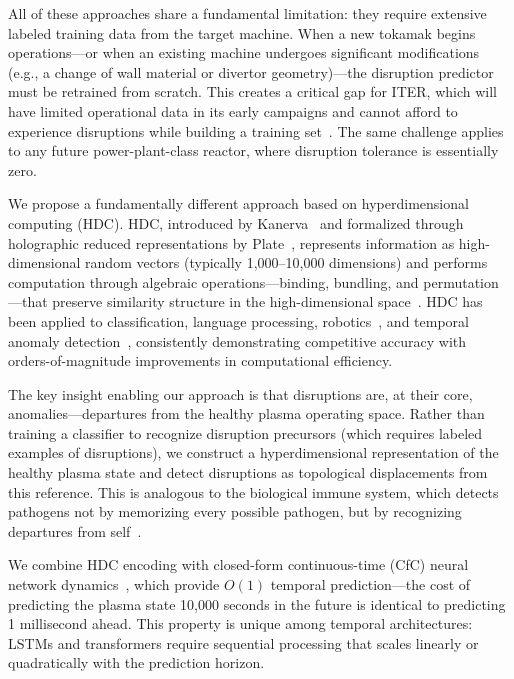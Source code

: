 \documentclass[twocolumn,prl,aps,superscriptaddress,floatfix]{revtex4-2}
\begin{document}
All of these approaches share a fundamental limitation: they require extensive labeled training data from the target machine. When a new tokamak begins operations---or when an existing machine undergoes significant modifications (e.g., a change of wall material or divertor geometry)---the disruption predictor must be retrained from scratch. This creates a critical gap for ITER, which will have limited operational data in its early campaigns and cannot afford to experience disruptions while building a training set~\cite{Strait2019,ITER2018}. The same challenge applies to any future power-plant-class reactor, where disruption tolerance is essentially zero.

We propose a fundamentally different approach based on hyperdimensional computing (HDC). HDC, introduced by Kanerva~\cite{Kanerva2009} and formalized through holographic reduced representations by Plate~\cite{Plate2003}, represents information as high-dimensional random vectors (typically 1,000--10,000 dimensions) and performs computation through algebraic operations---binding, bundling, and permutation---that preserve similarity structure in the high-dimensional space~\cite{Ge2020}. HDC has been applied to classification, language processing, robotics~\cite{Neubert2019}, and temporal anomaly detection~\cite{Thomas2022}, consistently demonstrating competitive accuracy with orders-of-magnitude improvements in computational efficiency.

The key insight enabling our approach is that disruptions are, at their core, anomalies---departures from the healthy plasma operating space. Rather than training a classifier to recognize disruption precursors (which requires labeled examples of disruptions), we construct a hyperdimensional representation of the healthy plasma state and detect disruptions as topological displacements from this reference. This is analogous to the biological immune system, which detects pathogens not by memorizing every possible pathogen, but by recognizing departures from self~\cite{Friston2010}.

We combine HDC encoding with closed-form continuous-time (CfC) neural network dynamics~\cite{Hasani2022}, which provide $O(1)$ temporal prediction---the cost of predicting the plasma state 10,000 seconds in the future is identical to predicting 1 millisecond ahead. This property is unique among temporal architectures: LSTMs and transformers require sequential processing that scales linearly or quadratically with the prediction horizon.
\end{document}
